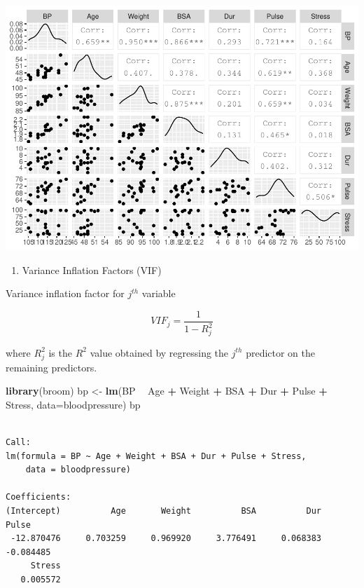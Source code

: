 \documentclass[]{article}
\newenvironment{Shaded}{\begin{snugshade}}{\end{snugshade}}
\newcommand{\DataTypeTok}[1]{\textcolor[rgb]{0.13,0.29,0.53}{#1}}
\newcommand{\KeywordTok}[1]{\textcolor[rgb]{0.13,0.29,0.53}{\textbf{#1}}}
\newcommand{\NormalTok}[1]{#1}
\newcommand{\OperatorTok}[1]{\textcolor[rgb]{0.81,0.36,0.00}{\textbf{#1}}}
\newcommand{\StringTok}[1]{\textcolor[rgb]{0.31,0.60,0.02}{#1}}
\providecommand{\tightlist}{%
  \setlength{\itemsep}{0pt}\setlength{\parskip}{0pt}}
\begin{document}
\includegraphics{regression13_files/figure-latex/unnamed-chunk-2-1.pdf}

\begin{enumerate}
\def\labelenumi{\arabic{enumi}.}
\setcounter{enumi}{1}
\tightlist
\item
  Variance Inflation Factors (VIF)
\end{enumerate}

Variance inflation factor for \(j^{th}\) variable

\[VIF_j = \frac{1}{1-R^2_j}\]

where \(R^2_j\) is the \(R^2\) value obtained by regressing the
\(j^{th}\) predictor on the remaining predictors.

\begin{Shaded}
\begin{Highlighting}[]
\KeywordTok{library}\NormalTok{(broom)}
\NormalTok{bp <-}\StringTok{ }\KeywordTok{lm}\NormalTok{(BP }\OperatorTok{~}\StringTok{ }\NormalTok{Age }\OperatorTok{+}\StringTok{ }\NormalTok{Weight }\OperatorTok{+}\StringTok{ }\NormalTok{BSA }\OperatorTok{+}\StringTok{ }\NormalTok{Dur }\OperatorTok{+}\StringTok{ }\NormalTok{Pulse }\OperatorTok{+}\StringTok{ }\NormalTok{Stress, }\DataTypeTok{data=}\NormalTok{bloodpressure)}
\NormalTok{bp}
\end{Highlighting}
\end{Shaded}

\begin{verbatim}

Call:
lm(formula = BP ~ Age + Weight + BSA + Dur + Pulse + Stress, 
    data = bloodpressure)

Coefficients:
(Intercept)          Age       Weight          BSA          Dur        Pulse  
 -12.870476     0.703259     0.969920     3.776491     0.068383    -0.084485  
     Stress  
   0.005572  
\end{verbatim}
\end{document}
